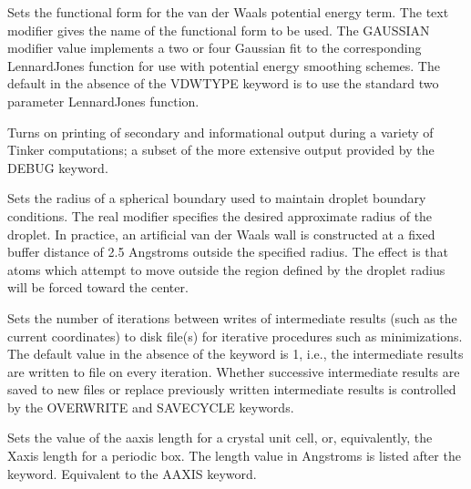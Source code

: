 \documentclass[letterpaper,11pt,english]{sphinxmanual}
\begin{document}
  Sets the functional form for the van der Waals potential energy term. The text modifier gives the name of the functional form to be used. The GAUSSIAN modifier value implements a two or four Gaussian fit to the corresponding Lennard\sphinxhyphen{}Jones function for use with potential energy smoothing schemes. The default in the absence of the VDWTYPE keyword is to use the standard two parameter Lennard\sphinxhyphen{}Jones function.

  Turns on printing of secondary and informational output during a variety of Tinker computations; a subset of the more extensive output provided by the DEBUG keyword.






  Sets the radius of a spherical boundary used to maintain droplet boundary conditions. The real modifier specifies the desired approximate radius of the droplet. In practice, an artificial van der Waals wall is constructed at a fixed buffer distance of 2.5 Angstroms outside the specified radius. The effect is that atoms which attempt to move outside the region defined by the droplet radius will be forced toward the center.

  Sets the number of iterations between writes of intermediate results (such as the current coordinates) to disk file(s) for iterative procedures such as minimizations. The default value in the absence of the keyword is 1, i.e., the intermediate results are written to file on every iteration. Whether successive intermediate results are saved to new files or replace previously written intermediate results is controlled by the OVERWRITE and SAVE\sphinxhyphen{}CYCLE keywords.

  Sets the value of the a\sphinxhyphen{}axis length for a crystal unit cell, or, equivalently, the X\sphinxhyphen{}axis length for a periodic box. The length value in Angstroms is listed after the keyword. Equivalent to the A\sphinxhyphen{}AXIS keyword.
\end{document}

